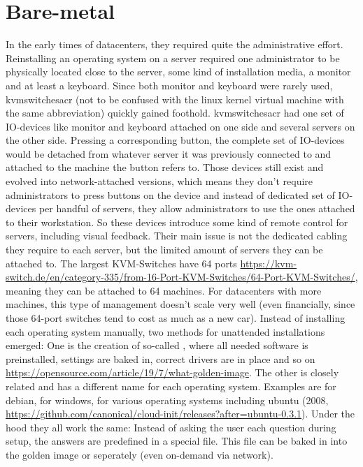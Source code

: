 \section{Bare-metal}
In the early times of datacenters, they required quite the administrative effort. Reinstalling an operating system on a server required one administrator to be physically located close to the server, some kind of installation media, a monitor and at least a keyboard. Since both monitor and keyboard were rarely used, \gls{kvmswitchesacr} (not to be confused with the linux kernel virtual machine with the same abbreviation) quickly gained foothold. \Gls{kvmswitchesacr} had one set of IO-devices like monitor and keyboard attached on one side and several servers on the other side. Pressing a corresponding button, the complete set of IO-devices would be  detached from whatever server it was previously connected to and attached to the machine the button refers to.
\newline
Those devices still exist and evolved into network-attached versions, which means they don't require administrators to press buttons on the device and instead of dedicated set of IO-devices per handful of servers, they allow administrators to use the ones attached to their workstation. So these devices introduce some kind of remote control for servers, including visual feedback.
Their main issue is not the dedicated cabling they require to each server, but the limited amount of servers they can be attached to. The largest KVM-Switches have 64 ports \url{https://kvm-switch.de/en/category-335/from-16-Port-KVM-Switches/64-Port-KVM-Switches/}, meaning they can be attached to 64 machines. For datacenters with more machines, this type of management doesn't scale very well (even financially, since those 64-port switches tend to cost as much as a new car).
\newline
Instead of installing each operating system manually, two methods for unattended installations emerged: One is the creation of so-called , where all needed software is preinstalled, settings are baked in, correct drivers are in place and so on \url{https://opensource.com/article/19/7/what-golden-image}. The other is closely related and has a different name for each operating system. Examples are  for debian,  for windows,  for various operating systems including ubuntu (2008, \url{https://github.com/canonical/cloud-init/releases?after=ubuntu-0.3.1}). Under the hood they all work the same: Instead of asking the user each question during setup, the answers are predefined in a special file. This file can be baked in into the golden image or seperately (even on-demand via network).
